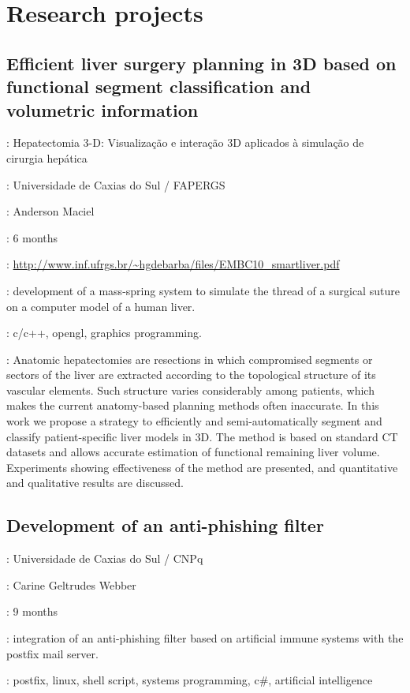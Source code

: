 \section*{Research projects}

\subsection*{
    Efficient liver surgery planning in 3D based on functional segment
    classification and volumetric information}

\begin{description}[noitemsep]
    \item[Original title]:
        Hepatectomia 3-D: Visualização e interação 3D aplicados à simulação de
        cirurgia hepática
    \item[Institution]: Universidade de Caxias do Sul / FAPERGS
    \item[Advisor]: Anderson Maciel
    \item[Duration]: 6 months
    \item[Website]:
        \url{http://www.inf.ufrgs.br/~hgdebarba/files/EMBC10_smartliver.pdf}
    \item[Attributions]:
        development of a mass-spring system to simulate the thread of a
        surgical suture on a computer model of a human liver.
    \item[Technologies]: c/c++, opengl, graphics programming.
    \item[Abstract]:
        Anatomic hepatectomies are resections in which compromised segments or
        sectors of the liver are extracted according to the topological
        structure of its vascular elements. Such structure varies considerably
        among patients, which makes the current anatomy-based planning methods
        often inaccurate. In this work we propose a strategy to efficiently and
        semi-automatically segment and classify patient-specific liver models
        in 3D. The method is based on standard CT datasets and allows accurate
        estimation of functional remaining liver volume. Experiments showing
        effectiveness of the method are presented, and quantitative and
        qualitative results are discussed.
\end{description}

\subsection*{Development of an anti-phishing filter}

\begin{description}[noitemsep]
    \item[Institution]: Universidade de Caxias do Sul / CNPq
    \item[Advisor]: Carine Geltrudes Webber
    \item[Duration]: 9 months
    \item[Attributions]:
        integration of an anti-phishing filter based on artificial immune
        systems with the postfix mail server.
    \item[Technologies]:
        postfix, linux, shell script, systems programming, c\#, artificial
        intelligence
\end{description}
